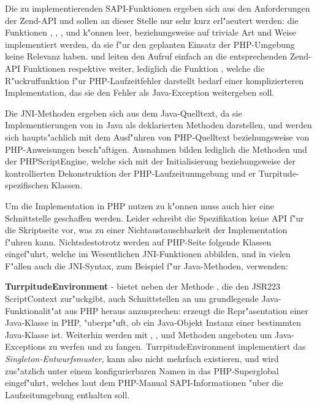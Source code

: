 Die zu implementierenden SAPI-Funktionen ergeben sich aus den Anforderungen der Zend-API und sollen an dieser Stelle nur
sehr kurz erl"aeutert werden: die Funktionen , , ,
 und  k"onnen leer, beziehungsweise auf triviale Art und Weise
implementiert werden, da sie f"ur den geplanten Einsatz der PHP-Umgebung keine Relevanz haben.
 und  leiten den Aufruf einfach an die entsprechenden
Zend-API Funktionen  respektive  weiter, lediglich
die Funktion , welche die R"uckruffunktion f"ur PHP-Laufzeitfehler darstellt bedarf einer
komplizierteren Implementation, das sie den Fehler als Java-Exception weitergeben soll.

Die JNI-Methoden ergeben sich aus dem Java-Quelltext, da sie Implementierungen von in Java als  deklarierten 
Methoden darstellen, und werden sich haupts"achlich mit dem Ausf"uhren von PHP-Quelltext beziehungsweise von PHP-Anweisungen
besch"aftigen. Ausnahmen bilden lediglich die Methoden  und  der PHPScriptEngine, welche
sich mit der Initialisierung beziehungsweise der kontrollierten Dekonstruktion der PHP-Laufzeitunmgebung und er Turpitude-spezifischen
Klassen.

Um die Implementation in PHP nutzen zu k"onnen muss auch hier eine Schnittstelle geschaffen werden. Leider schreibt
die Spezifikation keine API f"ur die Skriptseite vor, was zu einer Nichtaustauschbarkeit der Implementation f"uhren kann.
Nichtsdestotrotz werden auf PHP-Seite folgende Klassen eingef"uhrt, welche im Wesentlichen JNI-Funktionen abbilden, und
in vielen F"allen auch die JNI-Syntax, zum Beispiel f"ur Java-Methoden, verwenden:

\textbf{TurrpitudeEnvironment} - bietet neben der Methode , die den JSR223 ScriptContext zur"uckgibt,
auch Schnittstellen an um grundlegende Java-Funktionalit"at aus PHP heraus anzusprechen:
 erzeugt die Repr"asentation einer Java-Klasse in PHP,  "uberpr"uft, ob ein Java-Objekt 
Instanz einer bestimmten Java-Klasse ist. Weiterhin werden mit , ,  und 
 Methoden angeboten um Java-Exceptions zu werfen und zu fangen. TurrpitudeEnvironment implementiert
das \emph{Singleton-Entwurfsmuster}, kann also nicht mehrfach existieren, und wird zus"atzlich unter einem konfigurierbaren
Namen in das PHP-Superglobal  eingef"uhrt, welches laut dem PHP-Manual \cite{PHPMAN} SAPI-Informationen "uber die
Laufzeitumgebung enthalten soll.

